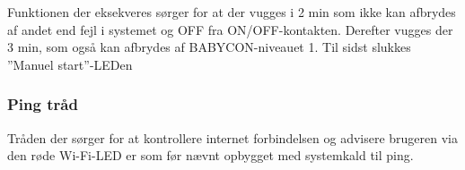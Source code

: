 Funktionen der eksekveres sørger for at der vugges i 2 min som ikke kan afbrydes af andet end fejl i systemet og OFF fra ON/OFF-kontakten. Derefter vugges der 3 min, som også kan afbrydes af BABYCON-niveauet 1. Til sidst slukkes ''Manuel start''-LEDen


\subsubsection*{Ping tråd}

Tråden der sørger for at kontrollere internet forbindelsen og advisere brugeren via den røde Wi-Fi-LED er som før nævnt opbygget med systemkald til ping. 
